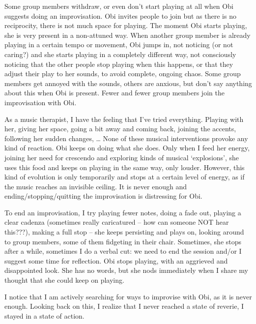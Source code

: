 \documentclass[authordate, empirical, issue]{jote-new-article}
\begin{document}
Some group members withdraw, or even don't start playing at all when Obi suggests doing an improvisation. Obi invites people to join but as there is no reciprocity, there is not much space for playing. The moment Obi starts playing, she is very present in a non-attuned way. When another group member is already playing in a certain tempo or movement, Obi jumps in, not noticing (or not caring?) and she starts playing in a completely different way, not consciously noticing that the other people stop playing when this happens, or that they adjust their play to her sounds, to avoid complete, ongoing chaos. Some group members get annoyed with the sounds, others are anxious, but don't say anything about this when Obi is present. Fewer and fewer group members join the improvisation with Obi.



As a music therapist, I have the feeling that I've tried everything. Playing with her, giving her space, going a bit away and coming back, joining the accents, following her sudden changes, … None of these musical interventions provoke any kind of reaction. Obi keeps on doing what she does. Only when I feed her energy, joining her need for crescendo and exploring kinds of musical ‘explosions', she uses this food and keeps on playing in the same way, only louder. However, this kind of evolution is only temporarily and stops at a certain level of energy, as if the music reaches an invisible ceiling. It is never enough and ending/stopping/quitting the improvisation is distressing for Obi.



To end an improvisation, I try playing fewer notes, doing a fade out, playing a clear cadenza (sometimes really caricatured -- how can someone NOT hear this???), making a full stop -- she keeps persisting and plays on, looking around to group members, some of them fidgeting in their chair. Sometimes, she stops after a while, sometimes I do a verbal cut: we need to end the session and/or I suggest some time for reflection. Obi stops playing, with an aggrieved and disappointed look. She has no words, but she nods immediately when I share my thought that she could keep on playing.



I notice that I am actively searching for ways to improvise with Obi, as it is never enough. Looking back on this, I realize that I never reached a state of reverie, I stayed in a state of action.
\end{document}
